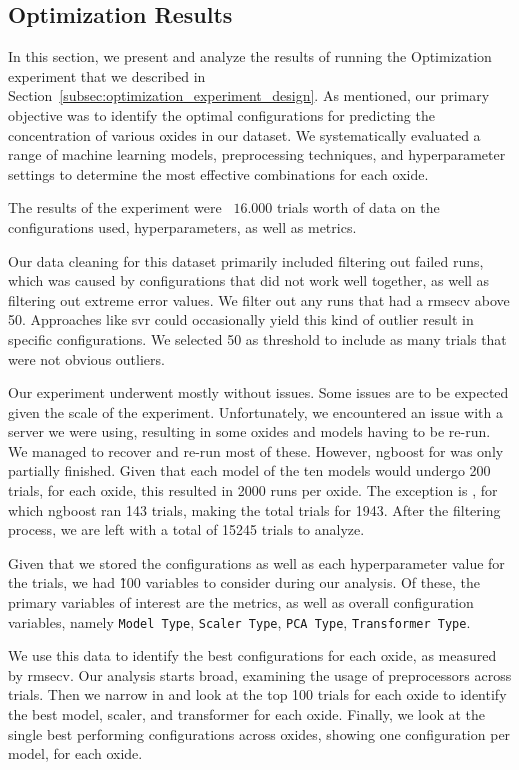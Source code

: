 \subsection{Optimization Results}\label{sec:optimization_results}
In this section, we present and analyze the results of running the Optimization experiment that we described in Section~\ref{subsec:optimization_experiment_design}.
As mentioned, our primary objective was to identify the optimal configurations for predicting the concentration of various oxides in our dataset.
We systematically evaluated a range of machine learning models, preprocessing techniques, and hyperparameter settings to determine the most effective combinations for each oxide.

The results of the experiment were ~$16.000$ trials worth of data on the configurations used, hyperparameters, as well as metrics.

Our data cleaning for this dataset primarily included filtering out failed runs, which was caused by configurations that did not work well together, as well as filtering out extreme error values.
We filter out any runs that had a \gls{rmsecv} above 50.
Approaches like \gls{svr} could occasionally yield this kind of outlier result in specific configurations.
We selected 50 as threshold to include as many trials that were not obvious outliers.

Our experiment underwent mostly without issues.
Some issues are to be expected given the scale of the experiment.
Unfortunately, we encountered an issue with a server we were using, resulting in some oxides and models having to be re-run.
We managed to recover and re-run most of these.
However, \gls{ngboost} for  was only partially finished.
Given that each model of the ten models would undergo 200 trials, for each oxide, this resulted in 2000 runs per oxide.
The exception is , for which \gls{ngboost} ran 143 trials, making the total trials for  1943.
After the filtering process, we are left with a total of 15245 trials to analyze.

Given that we stored the configurations as well as each hyperparameter value for the trials, we had \~100 variables to consider during our analysis.
Of these, the primary variables of interest are the metrics, as well as overall configuration variables, namely \texttt{Model Type}, \texttt{Scaler Type}, \texttt{PCA Type}, \texttt{Transformer Type}.

We use this data to identify the best configurations for each oxide, as measured by \gls{rmsecv}.
Our analysis starts broad, examining the usage of preprocessors across trials. Then we narrow in and look at the top 100 trials for each oxide to identify the best model, scaler, and transformer for each oxide.
Finally, we look at the single best performing configurations across oxides, showing one configuration per model, for each oxide.

